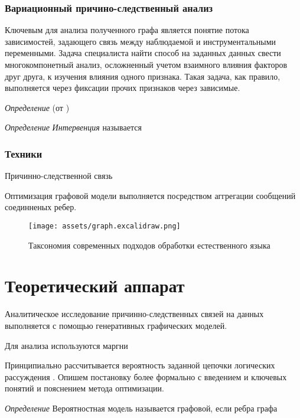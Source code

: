 \documentclass{article}
\begin{document}
\subsubsection{Вариационный причино-следственный анализ}

Ключевым для анализа полученного графа является понятие потока зависимостей, задающего связь между наблюдаемой и инструментальными переменными.
Задача специалиста найти способ на заданных данных свести многокомпонетный анализ, осложненный учетом
взаимного влияния факторов друг друга, к изучения влияния одного признака. Такая задача, как правило, выполняется через 
фиксации прочих признаков через зависимые. 

\textit{Определение} (от  ) 


\textit{Определение} \textit{Интервенция} называется


\subsubsection{Техники}

Причинно-следственной связь

Оптимизация графовой модели выполняется посредством аггрегации сообщений соединненых ребер.

\begin{figure}[h]
    \centering
    \texttt{[image: assets/graph.excalidraw.png]}
    \caption{Таксономия современных подходов обработки естественного языка}
    \label{llm_taxonomy}
\end{figure}



\section{Теоретический аппарат}




Аналитическое исследование причинно-следственных связей на данных выполняется с помощью генеративных графических моделей.

Для анализа используются маргни



Принципиально рассчитывается вероятность заданной цепочки логических рассуждения .
Опишем постановку более формально с введением и ключевых понятий и пояснением метода оптимизации. 

\textit{Определение} Вероятностная модель называется графовой, если ребра графа
\end{document}
